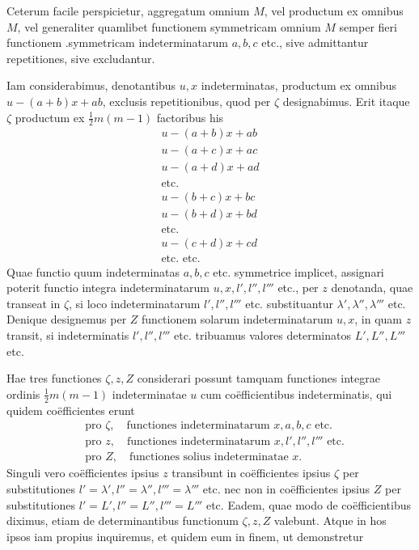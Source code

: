 Ceterum facile perspicietur, aggregatum omnium $M$, vel productum ex
omnibus $M$, vel generaliter quamlibet functionem symmetricam omnium $M$ semper fieri functionem .symmetricam indeterminatarum $a,b,c$ etc., sive admittantur repetitiones, sive excludantur.

Iam considerabimus, denotantibus $u,x$ indeterminatas, productum ex omnibus $u-(a+b)x+ab$, exclusis repetitionibus, quod per $\zeta$ designabimus. Erit
itaque $\zeta$ productum ex $\frac12m(m-1)$ factoribus his
\[
\begin{gathered}
u-(a+b)x+ab\\
u-(a+c)x+ac\\
u-(a+d)x+ad\\
\text{etc.}\\
u-(b+c)x+bc\\
u-(b+d)x+bd\\
\text{etc.}\\
u-(c+d)x+cd\\
\text{etc. etc.}
\end{gathered}
\]
Quae functio quum indeterminatas $a,b,c$ etc. symmetrice implicet, assignari
poterit functio integra indeterminatarum $u,x,l',l'',l'''$ etc., per $z$ denotanda,
quae transeat in $\zeta$, si loco indeterminatarum $l',l'',l'''$ etc. substituantur $\lambda',\lambda'',\lambda'''$ etc.
Denique designemus per $Z$ functionem solarum indeterminatarum $u,x$, in
quam $z$ transit, si indeterminatis $l',l'',l'''$ etc. tribuamus valores determinatos
$L',L'',L'''$ etc.

Hae tres functiones $\zeta,z,Z$ considerari possunt tamquam functiones integrae ordinis $\frac12m(m-1)$ indeterminatae $u$ cum coëfficientibus indeterminatis, qui
quidem coëfficientes erunt
\[
\begin{aligned}
&\text{pro }\zeta,\quad\text{functiones indeterminatarum }x,a,b,c\text{ etc.}\\
&\text{pro }z,\quad\text{functiones indeterminatarum }x,l',l'',l'''\text{ etc.}\\
&\text{pro }Z,\quad\text{functiones solius indeterminatae }x.
\end{aligned}
\]
Singuli vero coëfficientes ipsius $z$ transibunt in coëfficientes ipsius $\zeta$ per substitutiones $l'=\lambda',l''=\lambda'',l'''=\lambda'''$ etc. nec non in coëfficientes ipsius $Z$ per substitutiones $l'=L',l''=L'',l'''=L'''$ etc. Eadem, quae modo de coëfficientibus diximus, etiam de determinantibus functionum $\zeta,z,Z$ valebunt. Atque in
hos ipsos iam propius inquiremus, et quidem eum in finem, ut demonstretur

